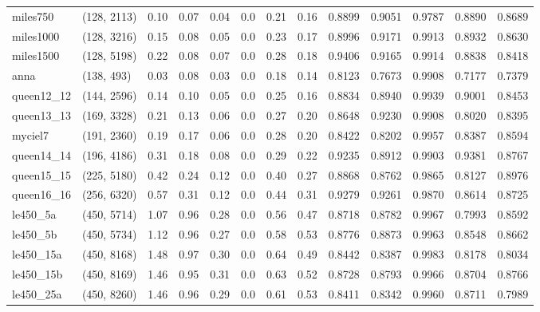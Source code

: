 \begin{tabular}{llrrrrrrrrrrr}
  miles750 &  (128, 2113) &  0.10 & 0.07 & 0.04 &  0.0 &  0.21 &   0.16 &   0.8899 &   0.9051 &    0.9787 &     0.8890 &      0.8689 \\
 miles1000 &  (128, 3216) &  0.15 & 0.08 & 0.05 &  0.0 &  0.23 &   0.17 &   0.8996 &   0.9171 &    0.9913 &     0.8932 &      0.8630 \\
 miles1500 &  (128, 5198) &  0.22 & 0.08 & 0.07 &  0.0 &  0.28 &   0.18 &   0.9406 &   0.9165 &    0.9914 &     0.8838 &      0.8418 \\
      anna &   (138, 493) &  0.03 & 0.08 & 0.03 &  0.0 &  0.18 &   0.14 &   0.8123 &   0.7673 &    0.9908 &     0.7177 &      0.7379 \\
queen12\_12 &  (144, 2596) &  0.14 & 0.10 & 0.05 &  0.0 &  0.25 &   0.16 &   0.8834 &   0.8940 &    0.9939 &     0.9001 &      0.8453 \\
queen13\_13 &  (169, 3328) &  0.21 & 0.13 & 0.06 &  0.0 &  0.27 &   0.20 &   0.8648 &   0.9230 &    0.9908 &     0.8020 &      0.8395 \\
   myciel7 &  (191, 2360) &  0.19 & 0.17 & 0.06 &  0.0 &  0.28 &   0.20 &   0.8422 &   0.8202 &    0.9957 &     0.8387 &      0.8594 \\
queen14\_14 &  (196, 4186) &  0.31 & 0.18 & 0.08 &  0.0 &  0.29 &   0.22 &   0.9235 &   0.8912 &    0.9903 &     0.9381 &      0.8767 \\
queen15\_15 &  (225, 5180) &  0.42 & 0.24 & 0.12 &  0.0 &  0.40 &   0.27 &   0.8868 &   0.8762 &    0.9865 &     0.8127 &      0.8976 \\
queen16\_16 &  (256, 6320) &  0.57 & 0.31 & 0.12 &  0.0 &  0.44 &   0.31 &   0.9279 &   0.9261 &    0.9870 &     0.8614 &      0.8725 \\
  le450\_5a &  (450, 5714) &  1.07 & 0.96 & 0.28 &  0.0 &  0.56 &   0.47 &   0.8718 &   0.8782 &    0.9967 &     0.7993 &      0.8592 \\
  le450\_5b &  (450, 5734) &  1.12 & 0.96 & 0.27 &  0.0 &  0.58 &   0.53 &   0.8776 &   0.8873 &    0.9963 &     0.8548 &      0.8662 \\
 le450\_15a &  (450, 8168) &  1.48 & 0.97 & 0.30 &  0.0 &  0.64 &   0.49 &   0.8442 &   0.8387 &    0.9983 &     0.8178 &      0.8034 \\
 le450\_15b &  (450, 8169) &  1.46 & 0.95 & 0.31 &  0.0 &  0.63 &   0.52 &   0.8728 &   0.8793 &    0.9966 &     0.8704 &      0.8766 \\
 le450\_25a &  (450, 8260) &  1.46 & 0.96 & 0.29 &  0.0 &  0.61 &   0.53 &   0.8411 &   0.8342 &    0.9960 &     0.8711 &      0.7989 \\

\end{tabular}
